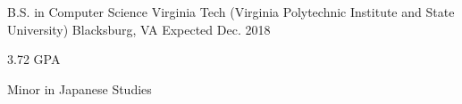 

\begin{cventries}

  \cventry
    {B.S. in Computer Science} %
    {Virginia Tech (Virginia Polytechnic Institute and State University)} %
    {Blacksburg, VA} %
    {Expected Dec. 2018} %
    {
      \begin{cvitems} %
        \item {3.72 GPA}
        \item {Minor in Japanese Studies}
      \end{cvitems}
    }

\end{cventries}

